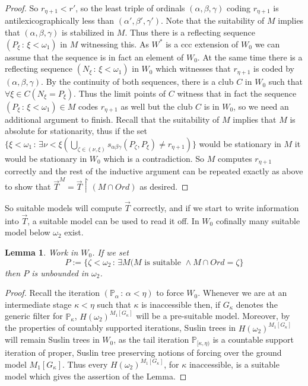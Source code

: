 \documentclass[a4paper,11pt]{article}
\newtheorem{lemma}[theorem]{Lemma}
\newcommand{\forceP}{\mathbb{P}}
\begin{document}
\begin{proof}
 So $r_{\eta+1}<r'$, so the least triple of ordinals $(\alpha, \beta, \gamma)$ coding $r_{\eta+1}$
 is antilexicographically less than $(\alpha', \beta', \gamma')$. Note that the suitability of $M$ implies
 that $(\alpha, \beta, \gamma)$ is stabilized in $M$. Thus there is a reflecting sequence
 $(P_{\xi} \, : \, \xi < \omega_1)$ in $M$ witnessing this. As $W^{\ast}$ is a ccc extension of $W_0$ we can assume
 that the sequence is in fact an element of $W_0$. At the same time there is a reflecting 
 sequence $(N_{\xi} \, : \, \xi < \omega_1)$ in $W_0$ which witnesses that $r_{\eta+1}$ is coded by $(\alpha, \beta, \gamma)$.
 By the continuity of both sequences, there is a club $C$ in $W_0$ such that
 $\forall \xi \in C ( N_{\xi} = P_{\xi}).$ Thus the limit points of $C$ witness that
 in fact the sequence $(P_{\xi} \, : \, \xi < \omega_1)\in M$ codes $r_{\eta+1}$ as well but the club
 $C$ is in $W_0$, so we need an additional argument to finish. Recall that the suitability of $M$
 implies that $M$ is absolute for stationarity, thus if the set 
 $\{ \xi < \omega_1 \, : \, \exists \nu < \xi ( \bigcup_{\zeta \in (\nu, \xi)} s_{\alpha \beta \gamma} (P_{\zeta}, P_{\xi}) \ne r_{\eta+1}) \}$
 would be stationary in $M$ it would be stationary in $W_0$ which is a contradiction.
 So $M$ computes $r_{\eta+1}$ correctly and the rest of the inductive argument can be repeated exactly as 
 above to show that $\vec{T}^M = \vec{T} \upharpoonright (M \cap Ord)$ as desired.
 
  \end{proof}

So suitable models will compute $\vec{T}$ correctly, and if we start to write information into $\vec{T}$, a suitable model can be used to read it off. In $W_0$ cofinally many suitable model below $\omega_2$ exist.

\begin{lemma}
Work in $W_0$. If we set
$$ P:= \{ \zeta < \omega_2 \, : \, \exists M (M \text{ is suitable } \land M \cap Ord = \zeta\}$$ then $P$ is unbounded in $\omega_2$.
\end{lemma}
\begin{proof}
Recall the iteration $(\forceP_{\alpha} \, : \, \alpha < \eta)$ to force $W_0$. Whenever we are at an intermediate stage $\kappa < \eta$ such that $\kappa$ is inaccessible then, if $G_{\kappa}$ denotes the generic filter for $\forceP_{\kappa}$, $H(\omega_2)^{M_1[G_{\kappa}]}$ will be a pre-suitable model.
Moreover, by the properties of countably supported iterations, Suslin trees in $H(\omega_2)^{M_1[G_{\kappa}]}$ will remain Suslin trees in $W_0$, as the tail iteration $\forceP_{[\kappa, \eta)}$ is a countable support iteration of proper, Suslin tree preserving notions of forcing over the ground model $M_1[G_{\kappa}]$. Thus every  $H(\omega_2)^{M_1[G_{\kappa}]}$, for $\kappa$ inaccessible, is a suitable model which gives the assertion of the Lemma.

\end{proof}
\end{document}
